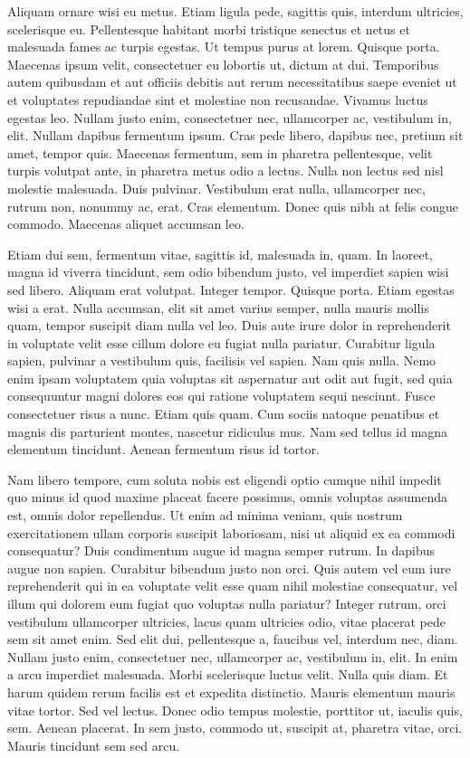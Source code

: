 \documentclass[english,master,dept460,male,cpp,cpdeclaration]{diploma}
\begin{document}
Aliquam ornare wisi eu metus. Etiam ligula pede, sagittis quis, interdum ultricies, scelerisque eu. Pellentesque habitant morbi tristique senectus et netus et malesuada fames ac turpis egestas. Ut tempus purus at lorem. Quisque porta. Maecenas ipsum velit, consectetuer eu lobortis ut, dictum at dui. Temporibus autem quibusdam et aut officiis debitis aut rerum necessitatibus saepe eveniet ut et voluptates repudiandae sint et molestiae non recusandae. Vivamus luctus egestas leo. Nullam justo enim, consectetuer nec, ullamcorper ac, vestibulum in, elit. Nullam dapibus fermentum ipsum. Cras pede libero, dapibus nec, pretium sit amet, tempor quis. Maecenas fermentum, sem in pharetra pellentesque, velit turpis volutpat ante, in pharetra metus odio a lectus. Nulla non lectus sed nisl molestie malesuada. Duis pulvinar. Vestibulum erat nulla, ullamcorper nec, rutrum non, nonummy ac, erat. Cras elementum. Donec quis nibh at felis congue commodo. Maecenas aliquet accumsan leo.

Etiam dui sem, fermentum vitae, sagittis id, malesuada in, quam. In laoreet, magna id viverra tincidunt, sem odio bibendum justo, vel imperdiet sapien wisi sed libero. Aliquam erat volutpat. Integer tempor. Quisque porta. Etiam egestas wisi a erat. Nulla accumsan, elit sit amet varius semper, nulla mauris mollis quam, tempor suscipit diam nulla vel leo. Duis aute irure dolor in reprehenderit in voluptate velit esse cillum dolore eu fugiat nulla pariatur. Curabitur ligula sapien, pulvinar a vestibulum quis, facilisis vel sapien. Nam quis nulla. Nemo enim ipsam voluptatem quia voluptas sit aspernatur aut odit aut fugit, sed quia consequuntur magni dolores eos qui ratione voluptatem sequi nesciunt. Fusce consectetuer risus a nunc. Etiam quis quam. Cum sociis natoque penatibus et magnis dis parturient montes, nascetur ridiculus mus. Nam sed tellus id magna elementum tincidunt. Aenean fermentum risus id tortor.

Nam libero tempore, cum soluta nobis est eligendi optio cumque nihil impedit quo minus id quod maxime placeat facere possimus, omnis voluptas assumenda est, omnis dolor repellendus. Ut enim ad minima veniam, quis nostrum exercitationem ullam corporis suscipit laboriosam, nisi ut aliquid ex ea commodi consequatur? Duis condimentum augue id magna semper rutrum. In dapibus augue non sapien. Curabitur bibendum justo non orci. Quis autem vel eum iure reprehenderit qui in ea voluptate velit esse quam nihil molestiae consequatur, vel illum qui dolorem eum fugiat quo voluptas nulla pariatur? Integer rutrum, orci vestibulum ullamcorper ultricies, lacus quam ultricies odio, vitae placerat pede sem sit amet enim. Sed elit dui, pellentesque a, faucibus vel, interdum nec, diam. Nullam justo enim, consectetuer nec, ullamcorper ac, vestibulum in, elit. In enim a arcu imperdiet malesuada. Morbi scelerisque luctus velit. Nulla quis diam. Et harum quidem rerum facilis est et expedita distinctio. Mauris elementum mauris vitae tortor. Sed vel lectus. Donec odio tempus molestie, porttitor ut, iaculis quis, sem. Aenean placerat. In sem justo, commodo ut, suscipit at, pharetra vitae, orci. Mauris tincidunt sem sed arcu.
\end{document}
